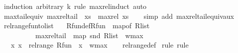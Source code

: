 \begin{isabellebody}
\ {\isacharparenleft}{\kern0pt}induction\ arbitrary{\isacharcolon}{\kern0pt}\ k\ rule{\isacharcolon}{\kern0pt}\ max{\isacharunderscore}{\kern0pt}rel{\isachardot}{\kern0pt}induct{\isacharparenright}{\kern0pt}\ auto%
\endisatagproof
{\isafoldproof}%
%
\isadelimproof
\isanewline
%
\endisadelimproof
\isanewline
{}\isamarkupfalse%
\ max{\isacharunderscore}{\kern0pt}tail{\isacharunderscore}{\kern0pt}equiv{\isacharcolon}{\kern0pt}\ {\isachardoublequoteopen}max{\isacharunderscore}{\kern0pt}rel{\isacharunderscore}{\kern0pt}tail\ {}\ xs\ {\isacharequal}{\kern0pt}\ max{\isacharunderscore}{\kern0pt}rel\ xs{\isachardoublequoteclose}\isanewline
%
\isadelimproof
\ \ %
\endisadelimproof
%
\isatagproof
{}\isamarkupfalse%
\ {\isacharparenleft}{\kern0pt}simp\ add{\isacharcolon}{\kern0pt}\ max{\isacharunderscore}{\kern0pt}rel{\isacharunderscore}{\kern0pt}tail{\isacharunderscore}{\kern0pt}equiv{\isacharunderscore}{\kern0pt}aux{\isacharparenright}{\kern0pt}%
\endisatagproof
{\isafoldproof}%
%
\isadelimproof
\isanewline
%
\endisadelimproof
\isanewline
{}\isamarkupfalse%
\ rel{\isacharunderscore}{\kern0pt}range{\isacharunderscore}{\kern0pt}fun{\isacharunderscore}{\kern0pt}to{\isacharunderscore}{\kern0pt}list{\isacharcolon}{\kern0pt}\isanewline
\ \ \ R{\isacharunderscore}{\kern0pt}fun{\isacharunderscore}{\kern0pt}def{\isacharcolon}{\kern0pt}{\isachardoublequoteopen}R{\isacharunderscore}{\kern0pt}fun\ {\isacharequal}{\kern0pt}\ map{\isacharunderscore}{\kern0pt}of\ R{\isacharunderscore}{\kern0pt}list{\isachardoublequoteclose}\ \isanewline
\ \ \ \ \ \ \ \ \ \ {\isachardoublequoteopen}max{\isacharunderscore}{\kern0pt}rel{\isacharunderscore}{\kern0pt}tail\ {}\ {\isacharparenleft}{\kern0pt}map\ snd\ R{\isacharunderscore}{\kern0pt}list{\isacharparenright}{\kern0pt}\ {\isacharequal}{\kern0pt}\ w{\isacharunderscore}{\kern0pt}max{\isachardoublequoteclose}\isanewline
\ \ \ {\isachardoublequoteopen}{\isasymforall}x{\isachardot}{\kern0pt}\ x\ {\isasymin}\ rel{\isacharunderscore}{\kern0pt}range\ R{\isacharunderscore}{\kern0pt}fun\ {\isasymlongrightarrow}\ x\ {\isasymle}\ w{\isacharunderscore}{\kern0pt}max{\isachardoublequoteclose}\isanewline
%
\isadelimproof
\ \ %
\endisadelimproof
%
\isatagproof
{}\isamarkupfalse%
\ rel{\isacharunderscore}{\kern0pt}range{\isacharunderscore}{\kern0pt}def\isanewline
{}\isamarkupfalse%
\ {\isacharparenleft}{\kern0pt}rule{\isacharcomma}{\kern0pt}\ rule{\isacharparenright}{\kern0pt}\isanewline

\end{isabellebody}
